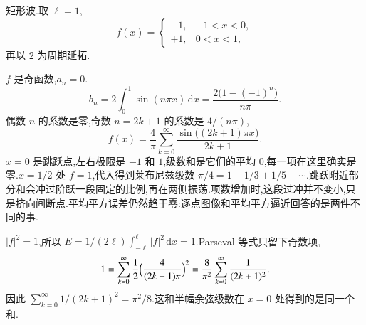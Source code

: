 \begin{example}
矩形波.取 $\ell=1$,
\begin{equation}
  f(x)=\begin{cases}
    -1, & -1<x<0,\\
    +1, & 0<x<1,
  \end{cases}
\end{equation}
再以 $2$ 为周期延拓.
\end{example}
\begin{solution}
$f$ 是奇函数,$a_n=0$.
\begin{equation}
  b_n=2\int_0^1\sin(n\pi x)\,\mathrm{d}x
  =\frac{2\bigl(1-(-1)^n\bigr)}{n\pi}.
\end{equation}
偶数 $n$ 的系数是零,奇数 $n=2k+1$ 的系数是 $4/(n\pi)$,
\begin{equation}
  f(x)=\frac{4}{\pi}\sum_{k=0}^{\infty}
    \frac{\sin\bigl((2k+1)\pi x\bigr)}{2k+1}.
\end{equation}
$x=0$ 是跳跃点,左右极限是 $-1$ 和 $1$,级数和是它们的平均 $0$,每一项在这里确实是零.$x=1/2$ 处 $f=1$,代入得到莱布尼兹级数 $\pi/4=1-1/3+1/5-\cdots$.跳跃附近部分和会冲过阶跃一段固定的比例,再在两侧振荡.项数增加时,这段过冲并不变小,只是挤向间断点.平均平方误差仍然趋于零:逐点图像和平均平方逼近回答的是两件不同的事.

$|f|^2=1$,所以 $E=1/(2\ell)\int_{-\ell}^{\ell}|f|^2\,\mathrm{d}x=1$.Parseval 等式只留下奇数项,
\begin{equation}
  1=\sum_{k=0}^{\infty}\frac12\Bigl(\frac{4}{(2k+1)\pi}\Bigr)^2
  =\frac{8}{\pi^2}\sum_{k=0}^{\infty}\frac{1}{(2k+1)^2}.
\end{equation}
因此 $\sum_{k=0}^{\infty}1/(2k+1)^2=\pi^2/8$.这和半幅余弦级数在 $x=0$ 处得到的是同一个和.
\end{solution}

